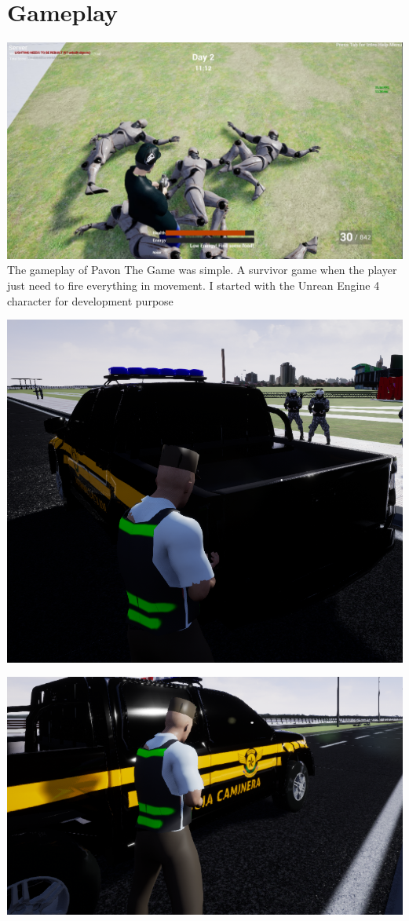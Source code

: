 \documentclass{article}
\begin{document}
  \section{Gameplay}
  \includegraphics[width=\textwidth]{85.jpg}
  The gameplay of Pavon The Game was simple. A survivor game when the player just need to fire everything in movement. I started with the Unrean Engine 4 character for development purpose
  
  \includegraphics[width=\textwidth]{86.png}

  \includegraphics[width=\textwidth]{87.png}
\end{document}
